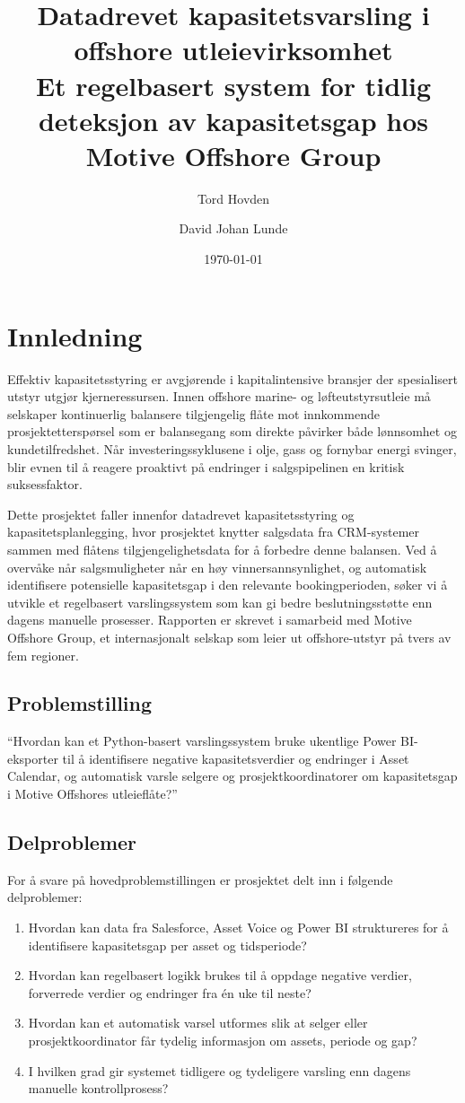 \documentclass[a4paper,11pt]{article}
\title{Datadrevet kapasitetsvarsling i offshore utleievirksomhet \\[0.3em]
  \large Et regelbasert system for tidlig deteksjon av kapasitetsgap hos Motive Offshore Group}
\author{Tord Hovden \and David Johan Lunde}
\date{\today}
\begin{document}
\maketitle
\tableofcontents
\newpage

\section{Innledning}

Effektiv kapasitetsstyring er avgjørende i kapitalintensive bransjer der spesialisert utstyr utgjør kjerneressursen. Innen offshore marine- og løfteutstyrsutleie må selskaper kontinuerlig balansere tilgjengelig flåte mot innkommende prosjektetterspørsel som er balansegang som direkte påvirker både lønnsomhet og kundetilfredshet. Når investeringssyklusene i olje, gass og fornybar energi svinger, blir evnen til å reagere proaktivt på endringer i salgspipelinen en kritisk suksessfaktor.

Dette prosjektet faller innenfor datadrevet kapasitetsstyring og kapasitetsplanlegging, hvor prosjektet knytter salgsdata fra CRM-systemer sammen med flåtens tilgjengelighetsdata for å forbedre denne balansen. Ved å overvåke når salgsmuligheter når en høy vinnersannsynlighet, og automatisk identifisere potensielle kapasitetsgap i den relevante bookingperioden, søker vi å utvikle et regelbasert varslingssystem som kan gi bedre beslutningsstøtte enn dagens manuelle prosesser. Rapporten er skrevet i samarbeid med Motive Offshore Group, et internasjonalt selskap som leier ut offshore-utstyr på tvers av fem regioner.

\subsection{Problemstilling}

“Hvordan kan et Python-basert varslingssystem bruke ukentlige Power BI-eksporter til å identifisere negative kapasitetsverdier og endringer i Asset Calendar, og automatisk varsle selgere og prosjektkoordinatorer om kapasitetsgap i Motive Offshores utleieflåte?”

\subsection{Delproblemer}

For å svare på hovedproblemstillingen er prosjektet delt inn i følgende delproblemer:

\begin{enumerate}
\item Hvordan kan data fra Salesforce, Asset Voice og Power BI struktureres for å identifisere kapasitetsgap per asset og tidsperiode?  
\item Hvordan kan regelbasert logikk brukes til å oppdage negative verdier, forverrede verdier og endringer fra én uke til neste?  
\item Hvordan kan et automatisk varsel utformes slik at selger eller prosjektkoordinator får tydelig informasjon om assets, periode og gap?  
\item I hvilken grad gir systemet tidligere og tydeligere varsling enn dagens manuelle kontrollprosess?
\end{enumerate}
\end{document}
